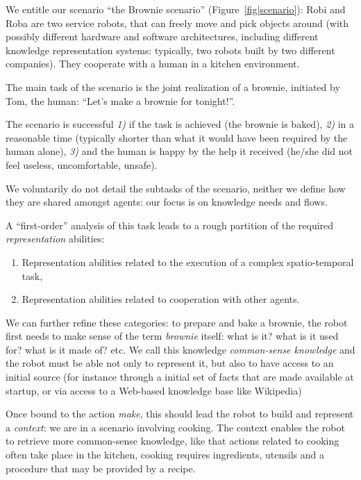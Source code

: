 We entitle our scenario ``the Brownie scenario'' (Figure~\ref{fig|scenario}):
Robi and Roba are two service robots, that can freely move and pick objects
around (with possibly different hardware and software architectures, including
different knowledge representation systems: typically, two robots built by two
different companies). They cooperate with a human in a kitchen environment.

The main task of the scenario is the joint realization of a brownie, initiated
by Tom, the human: ``Let's make a brownie for tonight!''.

The scenario is successful {\it 1)} if the task is achieved (the brownie is baked),
{\it 2)} in a reasonable time (typically shorter than what it would have been
required by the human alone), {\it 3)} and the human is happy by the help it received
(he/she did not feel useless, uncomfortable, unsafe).

We voluntarily do not detail the subtasks of the scenario, neither we define
how they are shared amongst agents: our focus is on knowledge needs and flows.

A ``first-order'' analysis of this task leads to a rough partition of the
required \emph{representation} abilities:

\begin{enumerate}

	\item Representation abilities related to the execution of a complex
	spatio-temporal task,

	\item Representation abilities related to cooperation with other agents.

\end{enumerate}

We can further refine these categories: to prepare and bake a brownie, the
robot first needs to make sense of the term \emph{brownie} itself: what is it?
what is it used for? what is it made of? etc. We call this knowledge
\emph{common-sense knowledge} and the robot must be able not only to represent
it, but also to have access to an initial source (for instance through a
initial set of facts that are made available at startup, or via access to a
Web-based knowledge base like Wikipedia)

Once bound to the action \emph{make}, this should lead the robot to build and
represent a \emph{context}: we are in a scenario involving cooking. The context
enables the robot to retrieve more common-sense knowledge, like that actions
related to cooking often take place in the kitchen, cooking requires
ingredients, utensils and a procedure that may be provided by a recipe.

